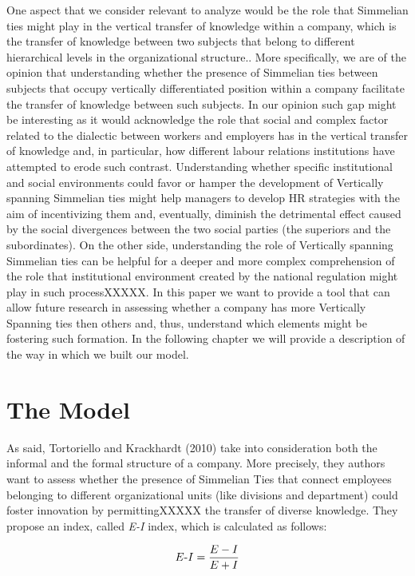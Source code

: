 \documentclass{article}
\begin{document}
One aspect that we consider relevant to analyze would be the role that Simmelian ties might play in the vertical transfer of knowledge within a company, which is the transfer of knowledge between two subjects that belong to different hierarchical levels in the organizational structure.. More specifically, we are of the opinion that understanding whether the presence of Simmelian ties between subjects that occupy vertically differentiated position within a company facilitate the transfer of knowledge between such subjects. In our opinion such gap might be interesting as it would acknowledge the role that social and complex factor related to the dialectic between workers and employers has in the vertical transfer of knowledge and, in particular, how different labour relations institutions have attempted to erode such contrast. Understanding whether specific institutional and social environments could favor or hamper the development of Vertically spanning Simmelian ties might help managers to develop HR strategies with the aim of incentivizing them and, eventually, diminish the detrimental effect caused by the social divergences between the two social parties (the superiors and the subordinates). On the other side, understanding the role of Vertically spanning Simmelian ties can be helpful for a deeper and more complex comprehension of the role that institutional environment created by the national regulation might play in such processXXXXX. 
In this paper we want to provide a tool that can allow future research in assessing whether a company has more Vertically Spanning ties then others and, thus, understand which elements might be fostering such formation.
In the following chapter we will provide a description of the way in which we built our model.


\newpage
\section{The Model}
As said, Tortoriello and Krackhardt (2010) take into consideration both the informal and the formal structure of a company. More precisely, they authors want to assess whether the presence of Simmelian Ties that connect employees belonging to different organizational units (like divisions and department) could foster innovation by permittingXXXXX the transfer of diverse knowledge. They propose an index, called  \emph{E-I} index, which is calculated as follows:


\begin{equation}\label{eqn}
E\textnormal{-}I=\frac{E-I}{E+I}
\end{equation}
\end{document}
